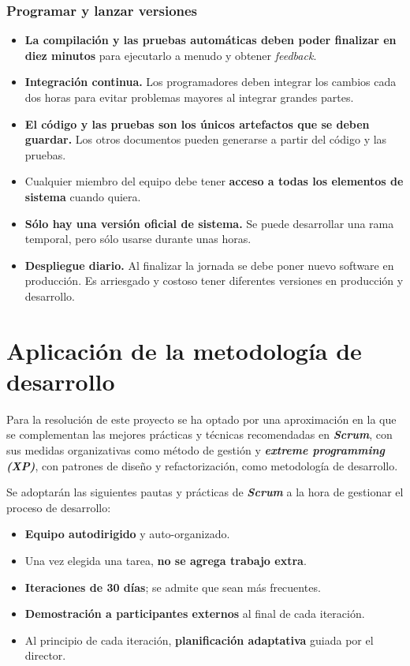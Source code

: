 \subsubsection{Programar y lanzar versiones}
\begin{itemize}
\item \textbf{La compilación y las pruebas automáticas deben poder finalizar en diez minutos} para ejecutarlo a menudo y obtener \textit{feedback}. 
\item \textbf{Integración continua.} Los programadores deben integrar los cambios cada dos horas para evitar problemas mayores al integrar grandes partes.
\item \textbf{El código y las pruebas son los únicos artefactos que se deben guardar.} Los otros documentos pueden generarse a partir del código y las pruebas.
\item Cualquier miembro del equipo debe tener \textbf{acceso a todas los elementos de sistema} cuando quiera. 
\item \textbf{Sólo hay una versión oficial de sistema.} Se puede desarrollar una rama temporal, pero sólo usarse durante unas horas.
\item \textbf{Despliegue diario.} Al finalizar la jornada se debe poner nuevo software en producción. Es arriesgado y costoso tener diferentes versiones en producción y desarrollo.
\end{itemize}

\section{Aplicación de la metodología de desarrollo}

Para la resolución de este proyecto se ha optado por una aproximación en la que se complementan las mejores prácticas y técnicas recomendadas en \textbf{\textit{Scrum}}, con sus medidas organizativas como método de gestión y \textbf{\textit{extreme programming (XP)}}, con patrones de diseño y refactorización, como metodología de desarrollo.

Se adoptarán las siguientes pautas y prácticas de \textbf{\textit{Scrum}} a la hora de gestionar el proceso de desarrollo:
\begin{itemize}
\item \textbf{Equipo autodirigido} y auto-organizado. 
\item Una vez elegida una tarea, \textbf{no se agrega trabajo extra}. %
\item \textbf{Iteraciones de 30 días}; se admite que sean más frecuentes.
\item \textbf{Demostración a participantes externos} al final de cada iteración. 
\item Al principio de cada iteración, \textbf{planificación adaptativa} guiada por el director.
\end{itemize}

